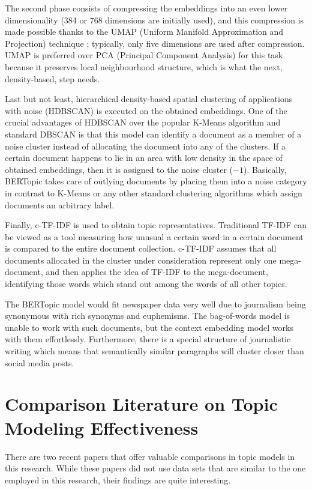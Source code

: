 The second phase consists of compressing the embeddings into an even lower dimensionality (384 or 768 dimensions are initially used), and this compression is made possible thanks to the UMAP (Uniform Manifold Approximation and Projection) technique \cite{mcinnes2018}; typically, only five dimensions are used after compression. UMAP is preferred over PCA (Principal Component Analysis) for this task because it preserves local neighbourhood structure, which is what the next, density-based, step needs.

Last but not least, hierarchical density-based spatial clustering of applications with noise (HDBSCAN) \cite{campello2013} is executed on the obtained embeddings. One of the crucial advantages of HDBSCAN over the popular K-Means algorithm and standard DBSCAN is that this model can identify a document as a member of a noise cluster instead of allocating the document into any of the clusters. If a certain document happens to lie in an area with low density in the space of obtained embeddings, then it is assigned to the noise cluster ($-1$). Basically, BERTopic takes care of outlying documents by placing them into a noise category in contrast to K-Means or any other standard clustering algorithms which assign documents an arbitrary label.

Finally, c-TF-IDF is used to obtain topic representatives. Traditional TF-IDF can be viewed as a tool measuring how unusual a certain word in a certain document is compared to the entire document collection. c-TF-IDF assumes that all documents allocated in the cluster under consideration represent only one mega-document, and then applies the idea of TF-IDF to the mega-document, identifying those words which stand out among the words of all other topics.

The BERTopic model would fit newspaper data very well due to journalism being synonymous with rich synonyms and euphemisms. The bag-of-words model is unable to work with such documents, but the context embedding model works with them effortlessly. Furthermore, there is a special structure of journalistic writing which means that semantically similar paragraphs will cluster closer than social media posts.

\section{Comparison Literature on Topic Modeling Effectiveness}

There are two recent papers that offer valuable comparisons in topic models in this research. While these papers did not use data sets that are similar to the one employed in this research, their findings are quite interesting.

